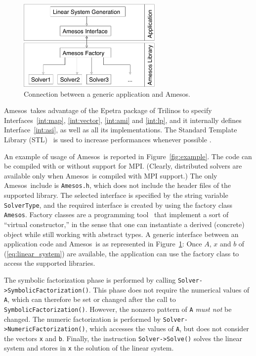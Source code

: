 \documentclass[acmtocl]{acmtrans2m}
\newcommand{\amesos}{{\sc Amesos}}
\begin{document}
\begin{figure}
\begin{center}
\includegraphics[width=7cm]{amesos_and_application.pdf}
\end{center}
\caption{Connection between a generic application and \amesos.}
\label{fig:app}
\end{figure}

\amesos\ takes advantage of the {\sc Epetra} package of Trilinos to specify
Interfaces~\ref{int:map}, \ref{int:vector}, \ref{int:ami} and \ref{int:lp}, 
  and it
internally defines Interface~\ref{int:asi}, as well as all its
implementations. The Standard Template Library (STL)~\cite{wise96overview} is used
to increase performances whenever possible .

An example of usage of \amesos\ is reported in Figure~\ref{fig:example}. The
code can be compiled with or without support for MPI. (Clearly, distributed
solvers are available only when \amesos\ is compiled with MPI support.) The only
\amesos\ include is \verb!Amesos.h!, which does not include the header files of
the supported library. The selected interface is specified by the string
variable \verb!SolverType!, and the required interface is created by using the
factory class \verb!Amesos!. Factory classes are a programming
tool~\cite{alexandrescu01modern} that implement a sort of ``virtual
constructor,'' in the sense that one can instantiate a derived (concrete) object
while still working with abstract types. A
generic interface between an application code and \amesos\ is as represented in
Figure~\ref{fig:app}: Once $A$, $x$ and $b$ of (\ref{eq:linear_system}) are
available, the application can use the factory class to access the
supported libraries.

The symbolic factorization phase is
performed by calling \verb!Solver->SymbolicFactorization()!.
This phase does not require the numerical values of \verb!A!, which can
therefore be set or changed after the call to \verb!SymbolicFactorization()!.
However,  the nonzero pattern of \verb!A! {\em must not} be
changed.
The numeric factorization is performed by
\verb!Solver->NumericFactorization()!, which
accesses the values of \verb!A!, but does not
consider the vectors \verb!x! and \verb!b!. Finally, the instruction
\verb!Solver->Solve()! solves the linear system and stores in \verb!x! the
solution of the linear system.
\end{document}
